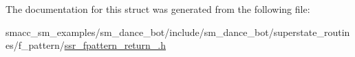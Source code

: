 The documentation for this struct was generated from the following file\+:\begin{DoxyCompactItemize}
\item 
smacc\+\_\+sm\+\_\+examples/sm\+\_\+dance\+\_\+bot/include/sm\+\_\+dance\+\_\+bot/superstate\+\_\+routines/f\+\_\+pattern/\hyperlink{ssr__fpattern__return__1_8h}{ssr\+\_\+fpattern\+\_\+return\+\_.\+h}\end{DoxyCompactItemize}
